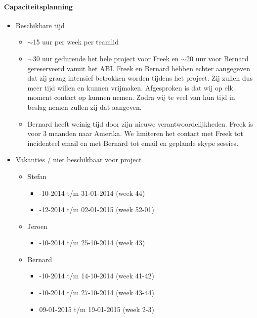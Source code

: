 \pagebreak

\paragraph{Capaciteitsplanning}

\begin{aanpassing1}
	\begin{itemize}
	 \item Beschikbare tijd
	 \begin{itemize}
	  \item $\sim$15 uur per week per teamlid
	  \item {\gray $\sim$30 uur gedurende het hele project voor Freek en $\sim$20 uur voor Bernard
	        gereserveerd vanuit het ABI. Freek en Bernard hebben echter aangegeven dat zij graag
	        intensief betrokken worden tijdens het project. Zij zullen dus meer tijd willen
	        en kunnen vrijmaken. Afgesproken is dat wij op elk moment contact op kunnen nemen.
	        Zodra wij te veel van hun tijd in beslag nemen zullen zij dat aangeven.
	        }%
	  \item Bernard heeft weinig tijd door zijn nieuwe verantwoordelijkheden. Freek is voor
	  		3 maanden naar Amerika. We limiteren het contact met Freek tot incidenteel email 
	  		en met Bernard tot email en geplande skype sessies. 
	 \end{itemize}


	 \item Vakanties / niet beschikbaar voor project
	 \begin{itemize}

	  \item Stefan
	  \begin{itemize}
	   \item {-10-2014 t/m 31-01-2014 (week 44)}
	   \item {-12-2014 t/m 02-01-2015 (week 52-01)}
	  \end{itemize}

	  \item Jeroen
	  \begin{itemize}
	   \item {-10-2014 t/m 25-10-2014 (week 43)}
	  \end{itemize}

	  \item Bernard
	   \begin{itemize}
	    \item {-10-2014 t/m 14-10-2014 (week 41-42)}
	    \item {-10-2014 t/m 27-10-2014 (week 43-44)}
	    \item 09-01-2015 t/m 19-01-2015 (week 2-3)
	   \end{itemize}

	 \end{itemize}
	\end{itemize}
\end{aanpassing1}
